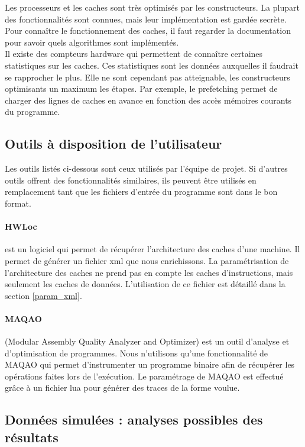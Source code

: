 Les processeurs et les caches sont très optimisés par les constructeurs. La plupart des fonctionnalités sont connues, mais leur implémentation est gardée secrète. Pour connaître le fonctionnement des caches, il faut regarder la documentation pour savoir quels algorithmes sont implémentés.\\

Il existe des compteurs hardware qui permettent de connaître certaines statistiques sur les caches. Ces statistiques sont les données auxquelles il faudrait se rapprocher le plus. Elle ne sont cependant pas atteignable, les constructeurs optimisants un maximum les étapes. Par exemple, le prefetching permet de charger des lignes de caches en avance en fonction des accès mémoires courants du programme.

\subsection{Outils à disposition de l'utilisateur}

Les outils listés ci-dessous sont ceux utilisés par l'équipe de projet. Si d'autres outils offrent des fonctionnalités similaires, ils peuvent être utilisés en remplacement tant que les fichiers d'entrée du programme sont dans le bon format.

\paragraph{HWLoc}

est un logiciel qui permet de récupérer l'architecture des caches d'une machine. Il permet de générer un fichier xml que nous enrichissons. La paramétrisation de l'architecture des caches ne prend pas en compte les caches d'instructions, mais seulement les caches de données. L'utilisation de ce fichier est détaillé dans la section \ref{param_xml}.

\paragraph{MAQAO}

(Modular Assembly Quality Analyzer and Optimizer) est un outil d'analyse et d'optimisation de programmes. Nous n'utilisons qu'une fonctionnalité de MAQAO qui permet d'instrumenter un programme binaire afin de récupérer les opérations faites lors de l'exécution. Le paramétrage de MAQAO est effectué grâce à un fichier lua pour générer des traces de la forme voulue.

\subsection{Données simulées : analyses possibles des résultats}

